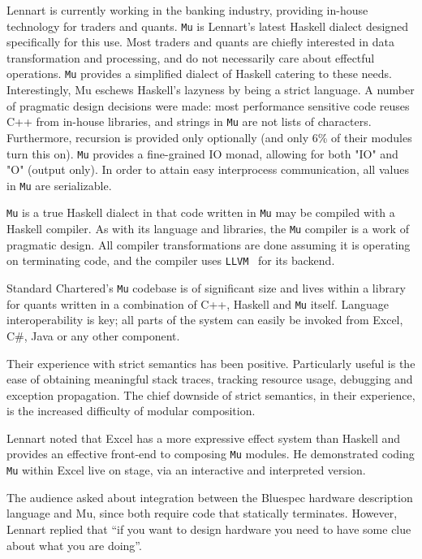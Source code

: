 \documentclass{jfp1}
\begin{document}
Lennart is currently working in the banking industry, providing in-house
technology for traders and quants.  {\tt Mu} is Lennart's latest Haskell
dialect designed specifically for this use.  Most traders and quants are
chiefly interested in data transformation and processing, and do not
necessarily care about effectful operations.  {\tt Mu} provides a
simplified dialect of Haskell catering to these needs.  Interestingly,
Mu eschews Haskell's lazyness by being a strict language.  A number of
pragmatic design decisions were made: most performance sensitive code
reuses C++ from in-house libraries, and strings in {\tt Mu} are not
lists of characters.  Furthermore, recursion is provided only optionally
(and only 6\% of their modules turn this on).  {\tt Mu} provides a
fine-grained IO monad, allowing for both "IO" and "O" (output only).  In
order to attain easy interprocess communication, all values in {\tt Mu}
are serializable.

{\tt Mu} is a true Haskell dialect in that code written in {\tt Mu}
may be compiled with a Haskell compiler.  As with its language and
libraries, the {\tt Mu} compiler is a work of pragmatic design.  All
compiler transformations are done assuming it is operating on
terminating code, and the compiler uses {\tt LLVM}~\cite{Lattner:2004:LCF:977395.977673} for its
backend.

Standard Chartered's {\tt Mu} codebase is of significant size and lives within a library
for quants written in a combination of C++, Haskell and {\tt Mu} itself.  Language
interoperability is key; all parts of the system can easily be invoked
from Excel, C\#, Java or any other component.

Their experience with strict semantics has been positive.  Particularly
useful is the ease of obtaining meaningful stack traces, tracking
resource usage, debugging and exception propagation.  The chief downside
of strict semantics, in their experience, is the increased difficulty of
modular composition.

Lennart noted that Excel has a more expressive effect system than
Haskell and provides an effective front-end to composing {\tt Mu}
modules.  He demonstrated coding {\tt Mu} within Excel live on stage, via an
interactive and interpreted version.

The audience asked about integration between the Bluespec hardware description
language and Mu, since both require code that statically terminates. However,
Lennart replied that ``if you want to design hardware you need to have some
clue about what you are doing''.
\end{document}
